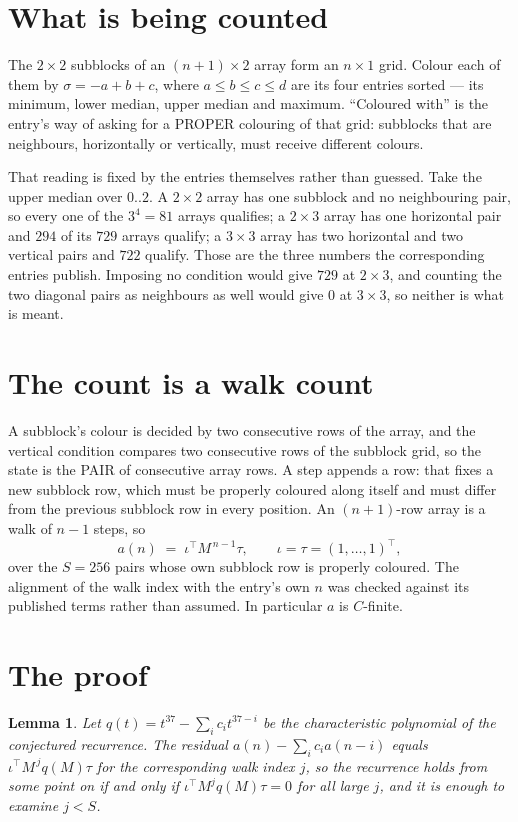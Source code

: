 \documentclass[11pt,a4paper]{article}
\theoremstyle{plain}
\newtheorem{lemma}[theorem]{Lemma}
\theoremstyle{definition}
\begin{document}
\section{What is being counted}

The $2\times2$ subblocks of an $(n+1)\times2$ array form an
$n\times1$ grid. Colour each of them by $\sigma=-a+b+c$, where $a\le b\le c\le d$ are its four entries sorted --- its minimum, lower median, upper median and maximum. ``Coloured with'' is the entry's way of
asking for a PROPER colouring of that grid: subblocks that are neighbours, horizontally or
vertically, must receive different colours.

That reading is fixed by the entries themselves rather than guessed. Take the upper median
over $0..2$. A $2\times2$ array has one subblock and no neighbouring pair, so every one of the
$3^4=81$ arrays qualifies; a $2\times3$ array has one horizontal pair and $294$ of its $729$
arrays qualify; a $3\times3$ array has two horizontal and two vertical pairs and $722$
qualify. Those are the three numbers the corresponding entries publish. Imposing no condition
would give $729$ at $2\times3$, and counting the two diagonal pairs as neighbours as well
would give $0$ at $3\times3$, so neither is what is meant.

\section{The count is a walk count}

A subblock's colour is decided by two consecutive rows of the array, and
the vertical condition compares two consecutive rows of the subblock grid, so the state is the
PAIR of consecutive array rows. A step appends a row: that fixes a new subblock row, which
must be properly coloured along itself and must differ from the previous subblock row in every
position. An $(n+1)$-row array is a walk of $n-1$ steps, so
\[
a(n)\;=\;\iota^{\!\top}M^{\,n-1}\tau,\qquad\iota=\tau=(1,\dots,1)^{\!\top},
\]
over the $S=256$ pairs whose own subblock row is properly coloured.
The alignment of the walk index with the entry's own $n$ was checked against its published
terms rather than assumed. In particular $a$ is $C$-finite.

\section{The proof}

\begin{lemma}\label{lem:crit}
Let $q(t)=t^{37}-\sum_i c_it^{37-i}$ be the characteristic polynomial of the
conjectured recurrence. The residual $a(n)-\sum_ic_ia(n-i)$ equals
$\iota^{\!\top}M^{\,j}q(M)\tau$ for the corresponding walk index $j$, so the recurrence
holds from some point on if and only if $\iota^{\!\top}M^{j}q(M)\tau=0$ for all large $j$,
and it is enough to examine $j<S$.
\end{lemma}
\end{document}
